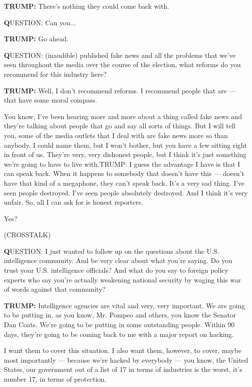 \textbf{TRUMP:} There's nothing they could come back with.

\textbf{Q}UESTION: Can you...

\textbf{TRUMP:} Go ahead.

\textbf{Q}UESTION: (inaudible) published fake news and all the problems
that we've seen throughout the media over the course of the election,
what reforms do you recommend for this industry here?

\textbf{TRUMP:} Well, I don't recommend reforms. I recommend people that
are --- that have some moral compass.

You know, I've been hearing more and more about a thing called fake news
and they're talking about people that go and say all sorts of things.
But I will tell you, some of the media outlets that I deal with are fake
news more so than anybody. I could name them, but I won't bother, but
you have a few sitting right in front of us. They're very, very
dishonest people, but I think it's just something we're going to have to
live with.TRUMP: I guess the advantage I have is that I can speak back.
When it happens to somebody that doesn't have this --- doesn't have that
kind of a megaphone, they can't speak back. It's a very sad thing. I've
seen people destroyed. I've seen people absolutely destroyed. And I
think it's very unfair. So, all I can ask for is honest reporters.

Yes?

(CROSSTALK)

\textbf{Q}UESTION: I just wanted to follow up on the questions about the
U.S. intelligence community. And be very clear about what you're saying.
Do you trust your U.S. intelligence officials? And what do you say to
foreign policy experts who say you're actually weakening national
security by waging this war of words against that community?

\textbf{TRUMP:} Intelligence agencies are vital and very, very
important. We are going to be putting in, as you know, Mr. Pompeo and
others, you know the Senator Dan Coats. We're going to be putting in
some outstanding people. Within 90 days, they're going to be coming back
to me with a major report on hacking.

I want them to cover this situation. I also want them, however, to
cover, maybe most importantly --- because we're hacked by everybody ---
you know, the United States, our government out of a list of 17 in terms
of industries is the worst, it's number 17, in terms of protection.


